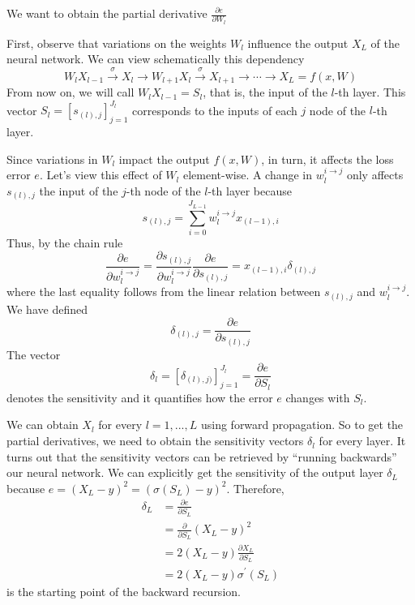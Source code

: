 We want to obtain the partial derivative $\frac{\partial e}{\partial W_l}$

First, observe that variations on the weights $W_l$ influence the output $X_L$ of the neural network. We can view schematically this dependency
$$W_l X_{l-1} \stackrel{\sigma}{\longrightarrow} X_l \longrightarrow W_{l+1}X_l \stackrel{\sigma}{\longrightarrow} X_{l+1} \longrightarrow \cdots \longrightarrow X_L = f(x, W) $$
From now on, we will call $W_l X_{l-1}=S_l$, that is, the input of the $l$-th layer. This vector $S_l = [s_{(l),j}]_{j=1}^{J_l}$ corresponds to the inputs of each $j$ node of the $l$-th layer.

Since variations in $W_l$ impact the output $f(x,W)$, in turn, it affects the loss error $e$. Let's view this effect of $W_l$ element-wise. A change in $w_l^{i\rightarrow j}$ only affects $s_{(l),j}$ the input of the $j$-th node of the $l$-th layer because $$s_{(l),j} = \sum_{i=0}^{J_{L-1}}w_l^{i\rightarrow j}x_{(l-1),i}$$
Thus, by the chain rule
\begin{equation}
    \frac{\partial e}{\partial w_l^{i\rightarrow j}} = \frac{\partial s_{(l),j}}{\partial w_l^{i\rightarrow j}} \frac{\partial e}{\partial s_{(l),j}} = x_{(l-1),i} \delta_{(l),j}
\end{equation}
where the last equality follows from the linear relation between $s_{(l),j}$ and $w_l^{i \rightarrow j}$. We have defined $$\delta_{(l),j} = \frac{\partial e}{\partial s_{(l),j}}$$
The vector $$\delta_l = [\delta_{(l),j)}]_{j=1}^{J_l} = \frac{\partial e}{\partial S_{l}}$$ denotes the sensitivity and it quantifies how the error $e$  changes with $S_l$. 

We can obtain $X_{l}$ for every $l=1,...,L$ using forward propagation. So to get the partial derivatives, we need to obtain the sensitivity vectors $\delta_l$ for every layer. It turns out that the sensitivity vectors can be retrieved by ``running backwards'' our neural network. We can explicitly get the sensitivity of the output layer $\delta_L$ because $e=(X_L-y)^2 = (\sigma(S_L)-y)^2$. Therefore,
\begin{align}
    \delta_L &=\frac{\partial e}{\partial S_L} \\
    &= \frac{\partial}{\partial S_L} (X_L -y)^2 \\
    &= 2(X_L-y)\frac{\partial X_L}{\partial S_L} \\
    &= 2(X_L-y)\sigma^\prime(S_L)
\end{align}
is the starting point of the backward recursion.

